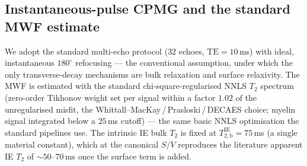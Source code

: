 \subsection{Instantaneous-pulse CPMG and the standard MWF estimate}
\label{sec:methods:mwf}

We adopt the standard multi-echo protocol ($32$ echoes, $\mathrm{TE}=10$\,ms) with
ideal, instantaneous $180^\circ$ refocusing --- the conventional assumption, under which
the only transverse-decay mechanisms are bulk relaxation and surface relaxivity. The MWF
is estimated with the standard chi-square-regularised NNLS $T_2$ spectrum (zero-order
Tikhonov weight set per signal within a factor $1.02$ of the unregularised misfit, the
Whittall--MacKay\,/\,Prasloski\,/\,DECAES choice; myelin signal integrated below a
$25$\,ms cutoff) \citep{Whittall1997, Prasloski2012, Doucette2020} --- the same basic NNLS
optimisation the standard pipelines use. The intrinsic IE bulk $T_2$
is fixed at $T_{2,\mathrm{b}}^{\mathrm{IE}}=75$\,ms (a single material constant), which at
the canonical $S/V$ reproduces the literature apparent IE $T_2$ of $\sim$$50$--$70$\,ms
once the surface term is added.

